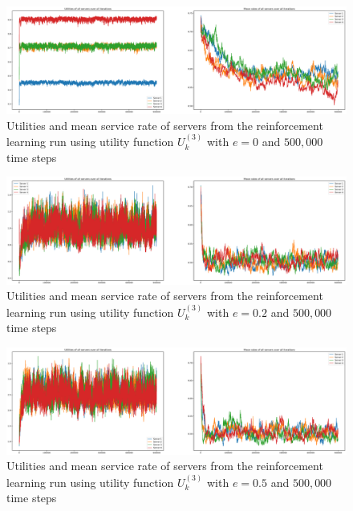 \begin{figure}[H]
    \includegraphics[width=\textwidth]{chapters/00_appendix/03_more_rl_results/Bin/utility_3_eps/u3_2_e0.eps}
    \caption{Utilities and mean service rate of servers from the reinforcement
    learning run using utility function \(U_k^{(3)}\) with \(e = 0\) and
    \(500,\!000\) time steps}
    \label{fig:RL_utility3_2_e0}
\end{figure}

\begin{figure}[H]
    \includegraphics[width=\textwidth]{chapters/00_appendix/03_more_rl_results/Bin/utility_3_eps/u3_2_e02.eps}
    \caption{Utilities and mean service rate of servers from the reinforcement
    learning run using utility function \(U_k^{(3)}\) with \(e = 0.2\) and
    \(500,\!000\) time steps}
    \label{fig:RL_utility3_2_e02}
\end{figure}

\begin{figure}[H]
    \includegraphics[width=\textwidth]{chapters/00_appendix/03_more_rl_results/Bin/utility_3_eps/u3_2_e05.eps}
    \caption{Utilities and mean service rate of servers from the reinforcement
    learning run using utility function \(U_k^{(3)}\) with \(e = 0.5\) and
    \(500,\!000\) time steps}
    \label{fig:RL_utility3_2_e05}
\end{figure}


